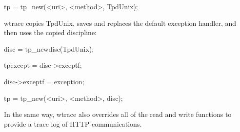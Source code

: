 {\ttfamily\mdseries
tp = tp\_new({\textless}uri{\textgreater}, {\textless}method{\textgreater}, TpdUnix);}


wtrace copies TpdUnix, saves and replaces the default exception
handler, and then uses the copied discipline:

{\ttfamily\mdseries
disc = tp\_newdisc(TpdUnix);}

{\ttfamily\mdseries
tpexcept = disc-{\textgreater}exceptf;}

{\ttfamily\mdseries
disc-{\textgreater}exceptf = exception;}


\bigskip

{\ttfamily\mdseries
tp = tp\_new({\textless}uri{\textgreater}, {\textless}method{\textgreater}, disc);}


In the same way, wtrace also overrides all of the read and write
functions to provide a trace log of HTTP communications.
